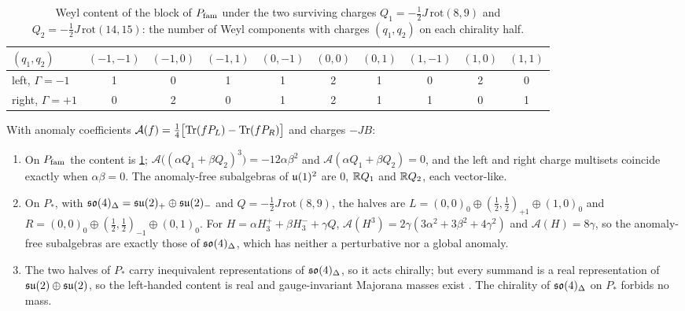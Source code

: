 \begin{table}[t]
\centering
\small
\begin{tabular}{@{}lccccccccc@{}}
\toprule
$(q_1,q_2)$ & $(-1,-1)$ & $(-1,0)$ & $(-1,1)$ & $(0,-1)$ & $(0,0)$ & $(0,1)$ & $(1,-1)$ & $(1,0)$ & $(1,1)$\\
\midrule
left, $\Gamma=-1$ & 1 & 0 & 1 & 1 & 2 & 1 & 0 & 2 & 0\\
right, $\Gamma=+1$ & 0 & 2 & 0 & 1 & 2 & 1 & 1 & 0 & 1\\
\bottomrule
\end{tabular}
\caption{Weyl content of the block of $P_{\rm fam}$ under the two surviving charges $Q_1=-\tfrac12J\,\mathrm{rot}(8,9)$ and $Q_2=-\tfrac12J\,\mathrm{rot}(14,15)$:
the number of Weyl components with charges $(q_1,q_2)$ on each chirality half.}
\label{tab:closurecontent}
\end{table}

\begin{theorem}
\label{thm:closurechiral}
With anomaly coefficients $\mathcal A(f)=\tfrac14\bigl[\operatorname{Tr}(fP_L)-\operatorname{Tr}(fP_R)\bigr]$ and charges $-JB$:
\begin{enumerate}[label=(\roman*),leftmargin=2.2em]
\item On $P_{\rm fam}$ the content is \cref{tab:closurecontent}; $\mathcal A\bigl((\alpha Q_1+\beta Q_2)^3\bigr)=-12\alpha\beta^2$ and $\mathcal A(\alpha Q_1+\beta Q_2)=0$, and
the left and right charge multisets coincide exactly when $\alpha\beta=0$. The anomaly-free subalgebras of $\mathfrak{u}(1)^2$ are $0$, $\mathbb{R} Q_1$ and $\mathbb{R} Q_2$,
each vector-like.
\item On $P_*$, with $\mathfrak{so}(4)_\Delta=\mathfrak{su}(2)_+\oplus\mathfrak{su}(2)_-$ and $Q=-\tfrac12J\,\mathrm{rot}(8,9)$, the halves are
$L=(0,0)_0\oplus(\tfrac12,\tfrac12)_{+1}\oplus(1,0)_0$ and $R=(0,0)_0\oplus(\tfrac12,\tfrac12)_{-1}\oplus(0,1)_0$. For $H=\alpha H^+_3+\beta H^-_3+\gamma Q$,
$\mathcal A(H^3)=2\gamma(3\alpha^2+3\beta^2+4\gamma^2)$ and $\mathcal A(H)=8\gamma$, so the anomaly-free subalgebras are exactly those of $\mathfrak{so}(4)_\Delta$, which
has neither a perturbative nor a global anomaly.
\item The two halves of $P_*$ carry inequivalent representations of $\mathfrak{so}(4)_\Delta$, so it acts chirally; but every summand is a real representation
of $\mathfrak{su}(2)\oplus\mathfrak{su}(2)$, so the left-handed content is real and gauge-invariant Majorana masses exist \cite{Suzuki2000}. The chirality of $\mathfrak{so}(4)_\Delta$
on $P_*$ forbids no mass.
\end{enumerate}
\end{theorem}

